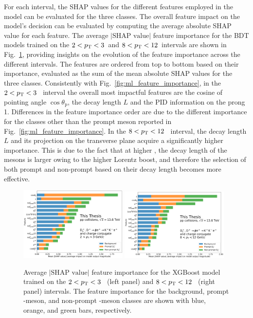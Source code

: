 For each \pt interval, the SHAP values for the different features employed in the model can be evaluated for the three classes. The overall feature impact on the model's decision can be evaluated by computing the average absolute SHAP value for each feature. The average $|\text{SHAP value}|$ feature importance for the BDT models trained on the $2<p_\mathrm{T}<3$~\gevc and $8<p_\mathrm{T}<12$~\gevc intervals are shown in Fig.~\ref{fig:ml_feature_importance_average}, providing insights on the evolution of the feature importance across the different \pt intervals. The features are ordered from top to bottom based on their importance, evaluated as the sum of the mean absolute SHAP values for the three classes. Consistently with Fig.~\ref{fig:ml_feature_importance}, in the \mbox{$2<p_\mathrm{T}<3$~\gevc} interval the overall most impactful features are the cosine of pointing angle $\cos\theta_\mathrm{p}$, the decay length $L$ and the PID information on the prong 1. Differences in the feature importance order are due to the different importance for the classes other than the prompt \ds meson reported in Fig.~\ref{fig:ml_feature_importance}. In the \mbox{$8<p_\mathrm{T}<12$~\gevc} interval, the decay length $L$ and its projection on the transverse plane acquire a significantly higher importance. This is due to the fact that at higher \pt, the decay length of the \ds mesons is larger owing to the higher Lorentz boost, and therefore the selection of both prompt and non-prompt based on their decay length becomes more effective.
\begin{figure}[htb]
    \centering
    \includegraphics[width=0.48\textwidth]{Figures/Chapter 5/SHAP_summary2_3.pdf}
    \includegraphics[width=0.48\textwidth]{Figures/Chapter 5/SHAP_summary8_12.pdf}
    \caption{Average $|\text{SHAP value}|$ feature importance for the XGBoost model trained on the \mbox{$2<p_\mathrm{T}<3$~\gevc} (left panel) and \mbox{$8<p_\mathrm{T}<12$~\gevc} (right panel) intervals. The feature importance for the background, prompt \ds-meson, and non-prompt \ds-meson classes are shown with blue, orange, and green bars, respectively.}
    \label{fig:ml_feature_importance_average}
\end{figure}

